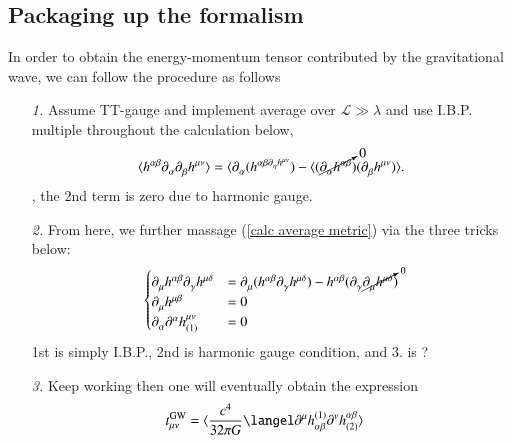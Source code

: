 \documentclass[a4paper, 12pt]{article}
\begin{document}
  \subsection{ Packaging up the formalism }%
    \label{sub: Packaging up the formalism }
    In order to obtain the energy-momentum tensor contributed by the
    gravitational wave, we can follow the procedure as follows 
    \begin{enumerate}
      \item[\it 1. ]  Assume TT-gauge and implement average over \(
       \mathcal{L} \gg \lambda  \) and use I.B.P. multiple
       throughout the calculation below, 
       \begin{align}
        \label{calc average metric}
         \langle h^{\alpha \beta} \partial_{\alpha}^{}
         \partial_{\beta}^{} h^{\mu \nu} \rangle = \langle
         \partial_{\alpha}^{} ( h^{\alpha \beta
         \partial_{\eta}^{} h^{\mu \nu} } ) - \langle
         (\cancelto{0}{\partial_{\alpha}^{} h^{\alpha
         \beta}})(\partial_{\beta}^{} h^{\mu \nu}) \rangle . 
       \end{align}, the 2nd term is zero due to harmonic gauge.
      \item[\it 2.] From here, we further massage (\ref{calc average
      metric}) via the three tricks below: 
      \begin{align}
        \label{average metric tricks}
        \begin{cases} 
          \partial_{\mu}^{} h^{\alpha \beta} \partial_{\gamma}^{}
          h^{\mu \delta} &= \partial_{\mu}^{} ( h^{\alpha \beta}
          \partial_{\gamma}^{} h^{\mu \delta} ) - h^{\alpha \beta}
          (\partial_{\gamma}^{} \cancelto{0}{\partial_{\mu}^{}
          h^{\mu \delta}}) \\
        \partial_{\mu}^{} h^{\mu \beta} &= 0 \\ 
          \partial_{\alpha}^{} \partial_{}^{\alpha} h_{(1)}^{\mu
          \nu} &= 0
        \end{cases} 
      \end{align}
      1st is simply I.B.P., 2nd is harmonic gauge condition, and 3. is
      ?
      \item[\it 3.] Keep working then one will eventually obtain the
      expression 
      \begin{align}
        \label{GW contribution to energy momentum tensor}
        t_{\mu \nu}^{\mathrm{GW}} &= \langle \frac{c^4}{32 \pi G} \langel
        \partial_{}^{\mu} h_{\alpha \beta}^{(1)} \partial_{}^{\nu}
        h_{(2)}^{\alpha \beta} \rangle 
      \end{align}
    \end{enumerate}
\end{document}
